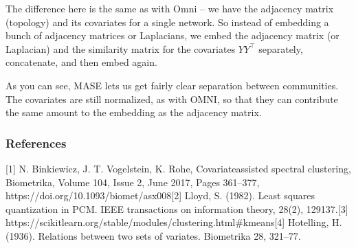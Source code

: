 \documentclass[letterpaper,10pt,english]{jupyterBook}
\begin{document}
\sphinxAtStartPar
The difference here is the same as with Omni – we have the adjacency matrix (topology) and its covariates for a single network. So instead of embedding a bunch of adjacency matrices or Laplacians, we embed the adjacency matrix (or Laplacian) and the similarity matrix for the covariates \(YY^\top\) separately, concatenate, and then embed again.

\begin{sphinxVerbatim}[commandchars=\\\{\}]
     

  
  \PYG{p}{[} \PYG{p}{]}
\end{sphinxVerbatim}

\noindent{}

\sphinxAtStartPar
As you can see, MASE lets us get fairly clear separation between communities. The covariates are still normalized, as with OMNI, so that they can contribute the same amount to the embedding as the adjacency matrix.


\subsubsection{References}
\label{\detokenize{representations/ch6/joint-representation-learning:references}}
\sphinxAtStartPar
{[}1{]} N. Binkiewicz, J. T. Vogelstein, K. Rohe, Covariate\sphinxhyphen{}assisted spectral clustering, Biometrika, Volume 104, Issue 2, June 2017, Pages 361–377, https://doi.org/10.1093/biomet/asx008{[}2{]} Lloyd, S. (1982). Least squares quantization in PCM. IEEE transactions on information theory, 28(2), 129\sphinxhyphen{}137.{[}3{]} https://scikit\sphinxhyphen{}learn.org/stable/modules/clustering.html\#k\sphinxhyphen{}means{[}4{]} Hotelling, H. (1936). Relations between two sets of variates. Biometrika 28, 321–77.
\end{document}
